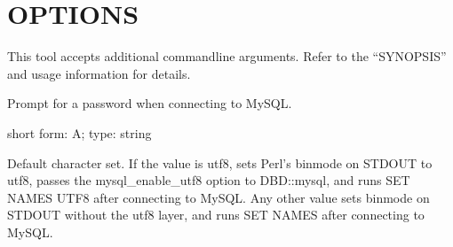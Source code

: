\documentclass[letterpaper,10pt,english]{sphinxmanual}
\begin{document}
\section{OPTIONS}
\label{\detokenize{mariadb-config-diff:options}}
\sphinxAtStartPar
This tool accepts additional command\sphinxhyphen{}line arguments.  Refer to the
“SYNOPSIS” and usage information for details.

\begin{fulllineitems}
\label{\detokenize{mariadb-config-diff:cmdoption-mariadb-config-diff-ask-pass}}
\sphinxAtStartPar
Prompt for a password when connecting to MySQL.

\end{fulllineitems}


\begin{fulllineitems}
\label{\detokenize{mariadb-config-diff:cmdoption-mariadb-config-diff-charset}}
\sphinxAtStartPar
short form: \sphinxhyphen{}A; type: string

\sphinxAtStartPar
Default character set.  If the value is utf8, sets Perl’s binmode on
STDOUT to utf8, passes the mysql\_enable\_utf8 option to DBD::mysql, and
runs SET NAMES UTF8 after connecting to MySQL.  Any other value sets
binmode on STDOUT without the utf8 layer, and runs SET NAMES after
connecting to MySQL.

\end{fulllineitems}
\end{document}
